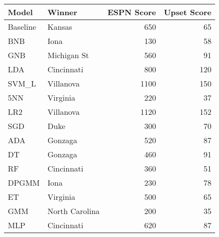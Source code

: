 \begin{tabular}{llrr}
\toprule
    Model &          Winner &  ESPN Score &  Upset Score \\
\midrule
 Baseline &          Kansas &         650 &           65 \\
      BNB &            Iona &         130 &           58 \\
      GNB &     Michigan St &         560 &           91 \\
      LDA &      Cincinnati &         800 &          120 \\
    SVM\_L &       Villanova &        1100 &          150 \\
      5NN &        Virginia &         220 &           37 \\
      LR2 &       Villanova &        1120 &          152 \\
      SGD &            Duke &         300 &           70 \\
      ADA &         Gonzaga &         520 &           87 \\
       DT &         Gonzaga &         460 &           91 \\
       RF &      Cincinnati &         360 &           51 \\
    DPGMM &            Iona &         230 &           78 \\
       ET &        Virginia &         500 &           65 \\
      GMM &  North Carolina &         200 &           35 \\
      MLP &      Cincinnati &         620 &           87 \\
\bottomrule
\end{tabular}
